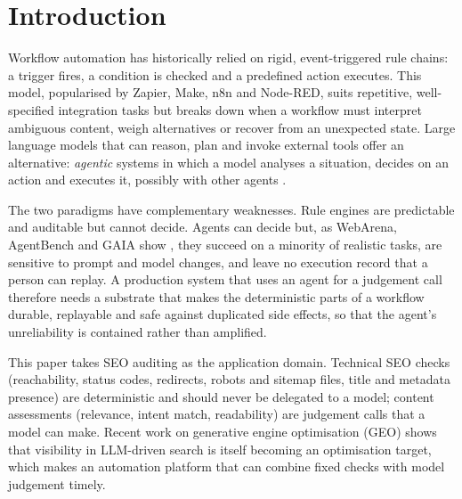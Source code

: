 \documentclass[conference]{IEEEtran}
\begin{document}
\section{Introduction}
Workflow automation has historically relied on rigid, event-triggered rule chains: a trigger fires, a condition is checked and a predefined action executes. This model, popularised by Zapier, Make, n8n and Node-RED, suits repetitive, well-specified integration tasks but breaks down when a workflow must interpret ambiguous content, weigh alternatives or recover from an unexpected state. Large language models that can reason, plan and invoke external tools offer an alternative: \emph{agentic} systems in which a model analyses a situation, decides on an action and executes it, possibly with other agents \cite{yao2023react,wu2023autogen}.

The two paradigms have complementary weaknesses. Rule engines are predictable and auditable but cannot decide. Agents can decide but, as WebArena, AgentBench and GAIA show \cite{zhou2024webarena,liu2024agentbench,mialon2023gaia}, they succeed on a minority of realistic tasks, are sensitive to prompt and model changes, and leave no execution record that a person can replay. A production system that uses an agent for a judgement call therefore needs a substrate that makes the deterministic parts of a workflow durable, replayable and safe against duplicated side effects, so that the agent's unreliability is contained rather than amplified.

This paper takes SEO auditing as the application domain. Technical SEO checks (reachability, status codes, redirects, robots and sitemap files, title and metadata presence) are deterministic and should never be delegated to a model; content assessments (relevance, intent match, readability) are judgement calls that a model can make. Recent work on generative engine optimisation (GEO) \cite{aggarwal2024geo} shows that visibility in LLM-driven search is itself becoming an optimisation target, which makes an automation platform that can combine fixed checks with model judgement timely.
\end{document}
